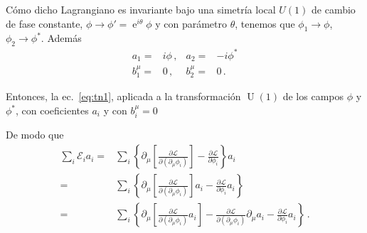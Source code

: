 Cómo dicho Lagrangiano es invariante bajo una simetría local $U(1)$ de cambio de fase constante, $\phi\to\phi'=\operatorname{e}^{i\theta}\phi$ y con parámetro $\theta$, tenemos que $\phi_1\to \phi$, $\phi_2\to \phi^{*}$. Además
\begin{align}
  a_1=&i\phi\,,& a_2=&-i\phi^{*} \nonumber\\
  b_1^{\mu}=&0\,,& b_2^{\mu}=&0\,.
\end{align}

Entonces, la ec.~\eqref{eq:tn1}, aplicada a la transformación $\operatorname{U}(1)$ de los campos $\phi$ y $\phi^{*}$, con coeficientes $a_i$ y con $b_i^{\mu}=0$



\begin{frame}
De modo que
\begin{align}
 \sum_i \mathcal{E}_ia_i=&\sum_i \left\{ \partial_{\mu} \left[ \frac{\partial\mathcal{L}}{\partial(\partial_{\mu}\phi_i)}\right]-\frac{\partial\mathcal{L}}{\partial\phi_i} \right\}a_i \nonumber\\
=&\sum_i \left\{ \partial_{\mu} \left[ \frac{\partial\mathcal{L}}{\partial(\partial_{\mu}\phi_i)}\right]a_i-\frac{\partial\mathcal{L}}{\partial\phi_i}a_i \right\} \nonumber\\
=&\sum_i \left\{ \partial_{\mu} \left[ \frac{\partial\mathcal{L}}{\partial(\partial_{\mu}\phi_i)}a_i\right]-\frac{\partial\mathcal{L}}{\partial(\partial_{\mu}\phi_i)}\partial_{\mu}a_i-\frac{\partial\mathcal{L}}{\partial\phi_i}a_i \right\}\,.
\end{align}
\end{frame}

